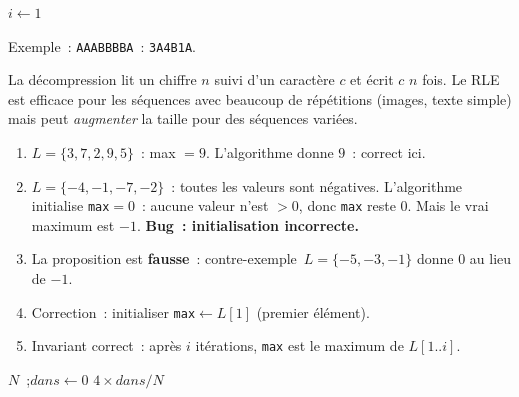 
\begin{algorithm}[H]
\caption{Compression RLE}
$i \leftarrow 1$\;
\end{algorithm}

Exemple~: \texttt{AAABBBBA}~:
\texttt{3A4B1A}.

La d\'ecompression lit un chiffre $n$ suivi d'un caract\`ere $c$ et \'ecrit $c$ $n$ fois.
Le RLE est efficace pour les s\'equences avec beaucoup de r\'ep\'etitions (images, texte simple)
mais peut \emph{augmenter} la taille pour des s\'equences vari\'ees.


\begin{enumerate}
  \item $L=\{3,7,2,9,5\}$~: max $=9$. L'algorithme donne $9$~: correct ici.
  \item $L=\{-4,-1,-7,-2\}$~: toutes les valeurs sont n\'egatives.
        L'algorithme initialise \texttt{max}$=0$~: aucune valeur n'est $>0$,
        donc \texttt{max} reste $0$. Mais le vrai maximum est $-1$.
        \textbf{Bug~: initialisation incorrecte.}
  \item La proposition est \textbf{fausse}~: contre-exemple~$L=\{-5,-3,-1\}$
        donne $0$ au lieu de $-1$.
  \item Correction~: initialiser \texttt{max}$\leftarrow L[1]$ (premier \'el\'ement).
  \item Invariant correct~: \og apr\`es $i$ it\'erations, \texttt{max}
        est le maximum de $L[1..i]$\fg.
\end{enumerate}


\begin{algorithm}[H]
\caption{Monte-Carlo pour $\pi$}
\Lire $N$~;\quad $\mathit{dans} \leftarrow 0$\;
\Afficher $4 \times \mathit{dans}/N$\;
\end{algorithm}

